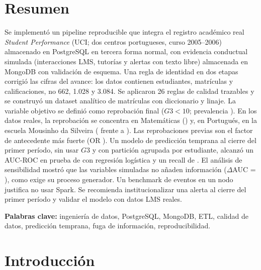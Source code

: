 \documentclass[11pt,a4paper]{article}
\begin{document}
\section*{Resumen}
Se implementó un pipeline reproducible que integra el registro académico real
\emph{Student Performance} (UCI; dos centros portugueses, curso 2005--2006) almacenado en PostgreSQL
en tercera forma normal, con evidencia conductual simulada (interacciones LMS, tutorías y alertas con
texto libre) almacenada en MongoDB con validación de esquema. Una regla de identidad en dos etapas
corrigió las cifras del avance: los datos contienen \nEst{} estudiantes, \nMat{} matrículas y
\nCal{} calificaciones, no 662, 1.028 y 3.084. Se aplicaron 26 reglas de calidad trazables y se construyó un dataset analítico de \nFilasDs{} matrículas con diccionario y linaje. La variable objetivo se definió como reprobación final ($G3<10$;
prevalencia \prevTot{}). En los datos reales, la reprobación se concentra en Matemáticas
(\prevMat{}) y, en Portugués, en la escuela Mousinho da Silveira (\tasaPorMs{} frente a \tasaPorGp{}).
Las reprobaciones previas son el factor de antecedente más fuerte (OR \orReprob{}).
Un modelo de predicción temprana al cierre del primer período, sin usar $G3$ y con partición
agrupada por estudiante, alcanzó un AUC-ROC en prueba de \aucALr{} \aucIcALr{} con regresión logística y un recall de \recALr{}. El análisis de sensibilidad mostró que las variables simuladas no añaden
información ($\Delta$AUC = \dAsimALr{}), como exige su proceso generador.
Un benchmark de \benchMaxFilas{} eventos en un nodo justifica no usar Spark.
Se recomienda institucionalizar una alerta al cierre del primer período y validar el modelo con
datos LMS reales.

\noindent\textbf{Palabras clave:} ingeniería de datos, PostgreSQL, MongoDB, ETL, calidad de datos,
predicción temprana, fuga de información, reproducibilidad.

\tableofcontents
\listoffigures
\listoftables
\newpage

\section{Introducción}
\end{document}
